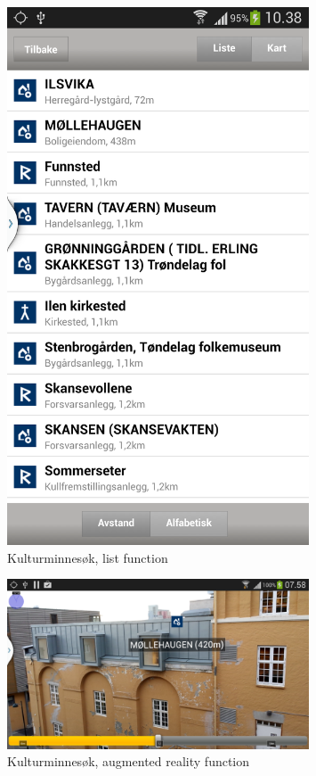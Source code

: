 \documentclass[11pt]{book}
\begin{document}
\begin{figure}[H]
      \centering
      \includegraphics[width=0.8\textwidth]{Figures/Prestudy/kulturSokList.png}
      \caption{Kulturminnesøk, list function}
      \label{fig:pre_kulturMinneAppList}
\end{figure}

\begin{figure}[H]
      \centering
      \includegraphics[width=0.8\textwidth]{Figures/Prestudy/kulturSokAR1.png}
      \caption{Kulturminnesøk, augmented reality function}
      \label{fig:pre_kulturMinneAppAug}
\end{figure}
\end{document}
